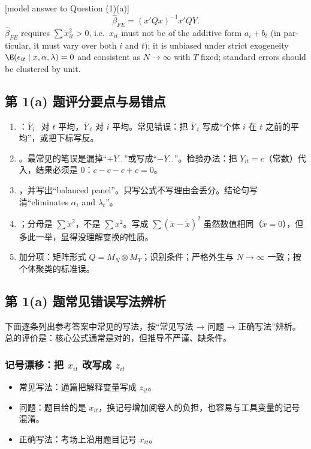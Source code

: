 \begin{english}[model answer to Question (1)(a)]
\[
\hat\beta_{FE}=(x'Qx)^{-1}x'QY.
\]
$\hat\beta_{FE}$ requires $\sum\ddot x_{it}^2>0$, i.e.\ $x_{it}$ must not be of the additive form $a_i+b_t$ (in particular, it must vary over both $i$ and $t$); it is unbiased under strict exogeneity $\E(\epsilon_{it}\mid x,\alpha,\lambda)=0$ and consistent as $N\to\infty$ with $T$ fixed; standard errors should be clustered by unit.
\end{english}

\subsection{第 1(a) 题评分要点与易错点}

\begin{note}[1(a) 评分要点与易错点]
\begin{enumerate}
  \item {}：$\bar Y_{i\cdot}$ 对 $t$ 平均，$\bar Y_{\cdot t}$ 对 $i$ 平均。常见错误：把 $\bar Y_{\cdot t}$ 写成“个体 $i$ 在 $t$ 之前的平均”，或把下标写反。
  \item {}。最常见的笔误是漏掉“$+\bar Y_{\cdot\cdot}$”或写成“$-\bar Y_{\cdot\cdot}$”。检验办法：把 $Y_{it}=c$（常数）代入，结果必须是 0：$c-c-c+c=0$。
  \item {}，并写出“balanced panel”。只写公式不写理由会丢分。结论句写清“eliminates $\alpha_i$ and $\lambda_t$”。
  \item {}；分母是 $\sum\ddot x^2$，不是 $\sum x^2$。写成 $\sum(\ddot x-\bar{\ddot x})^2$ 虽然数值相同（$\bar{\ddot x}=0$），但多此一举，显得没理解变换的性质。
  \item 加分项：矩阵形式 $Q=M_N\otimes M_T$；识别条件；严格外生与 $N\to\infty$ 一致；按个体聚类的标准误。
\end{enumerate}
\end{note}

\subsection{第 1(a) 题常见错误写法辨析}

下面逐条列出参考答案中常见的写法，按“常见写法 → 问题 → 正确写法”辨析。总的评价是：核心公式通常是对的，但推导不严谨、缺条件。

\subsubsection{记号漂移：把 \texorpdfstring{$x_{it}$}{x\_it} 改写成 \texorpdfstring{$z_{it}$}{z\_it}}
\begin{itemize}
  \item 常见写法：通篇把解释变量写成 $z_{it}$。
  \item 问题：题目给的是 $x_{it}$，换记号增加阅卷人的负担，也容易与工具变量的记号混淆。
  \item 正确写法：考场上沿用题目记号 $x_{it}$。
\end{itemize}

